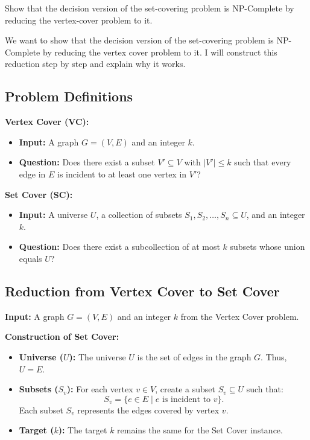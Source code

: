 \documentclass[10pt,letter,notitlepage]{article}
\newcounter{exercise}
\begin{document}
\begin{exercise}[(15 marks)]

Show that the decision version of the set-covering problem is NP-Complete by reducing the vertex-cover problem to it.

\end{exercise}

\begin{Answer}

We want to show that the decision version of the set-covering problem is NP-Complete by reducing the vertex cover problem to it. I will construct this reduction step by step and explain why it works.

\subsection*{Problem Definitions}

\textbf{Vertex Cover (VC):}
\begin{itemize}
    \item \textbf{Input:} A graph \(G = (V, E)\) and an integer \(k\).
    \item \textbf{Question:} Does there exist a subset \(V' \subseteq V\) with \(|V'| \leq k\) such that every edge in \(E\) is incident to at least one vertex in \(V'\)?
\end{itemize}

\textbf{Set Cover (SC):}
\begin{itemize}
    \item \textbf{Input:} A universe \(U\), a collection of subsets \(S_1, S_2, \dots, S_n \subseteq U\), and an integer \(k\).
    \item \textbf{Question:} Does there exist a subcollection of at most \(k\) subsets whose union equals \(U\)?
\end{itemize}

\subsection*{Reduction from Vertex Cover to Set Cover}

\textbf{Input:} A graph \(G = (V, E)\) and an integer \(k\) from the Vertex Cover problem.

\textbf{Construction of Set Cover:}
\begin{itemize}
    \item \textbf{Universe (\(U\)):} The universe \(U\) is the set of edges in the graph \(G\). Thus, \(U = E\).
    \item \textbf{Subsets (\(S_v\)):} For each vertex \(v \in V\), create a subset \(S_v \subseteq U\) such that:
    \[
    S_v = \{e \in E \mid e \text{ is incident to } v\}.
    \]
    Each subset \(S_v\) represents the edges covered by vertex \(v\).
    \item \textbf{Target (\(k\)):} The target \(k\) remains the same for the Set Cover instance.
\end{itemize}


\end{Answer}
\end{document}
